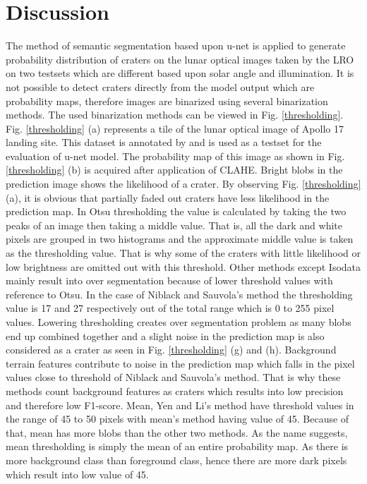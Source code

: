 \documentclass[11pt]{article}
\begin{document}
\newpage
\section{Discussion}
The method of semantic segmentation based upon u-net is applied to generate probability distribution of craters on the lunar optical images taken by the LRO on two testsets which are different based upon solar angle and illumination. It is not possible to detect craters directly from the model output which are probability maps, therefore images are binarized using several binarization methods. The used binarization methods can be viewed in Fig. \ref{thresholding}. Fig. \ref{thresholding} (a) represents a tile of the lunar optical image of Apollo 17 landing site. This dataset is annotated by \cite{dino2020} and is used as a testset for the evaluation of u-net model. The probability map of this image as shown in Fig. \ref{thresholding} (b) is acquired after application of CLAHE. Bright blobs in the prediction image shows the likelihood of a crater. By observing Fig. \ref{thresholding} (a), it is obvious that partially faded out craters have less likelihood in the prediction map. In Otsu thresholding the value is calculated by taking the two peaks of an image then taking a middle value. That is, all the dark and white pixels are grouped in two histograms and the approximate middle value is taken as the thresholding value. That is why some of the craters with little likelihood or low brightness are omitted out with this threshold. Other methods except Isodata mainly result into over segmentation because of lower threshold values with reference to Otsu. In the case of Niblack and Sauvola's method the thresholding value is 17 and 27 respectively out of the total range which is 0 to 255 pixel values. Lowering thresholding creates over segmentation problem as many blobs end up combined together and a slight noise in the prediction map is also considered as a crater as seen in Fig. \ref{thresholding} (g) and (h). Background terrain features contribute to noise in the prediction map which falls in the pixel values close to threshold of Niblack and Sauvola's method. That is why these methods count background features as craters which results into low precision and therefore low F1-score. Mean, Yen and Li's method have threshold values in the range of 45 to 50 pixels with mean's method having value of 45. Because of that, mean has more blobs than the other two methods. As the name suggests, mean thresholding is simply the mean of an entire probability map. As there is more background class than foreground class, hence there are more dark pixels which result into low value of 45.
\end{document}
